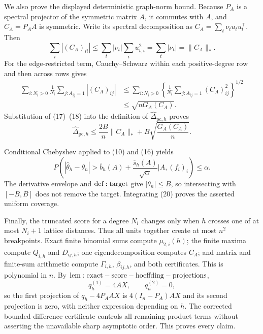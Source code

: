 We also prove the displayed deterministic graph-norm bound.  Because \(P_A\) is a spectral projector of the symmetric matrix \(A\), it commutes with \(A\), and \(C_A=P_AA\) is symmetric.  Write its spectral decomposition as \(C_A=\sum_t\nu_tu_tu_t^\top\).  Then
\[
 \sum_i|(C_A)_{ii}|
 \le\sum_t|\nu_t|\sum_i u_{t,i}^2
 =\sum_t|\nu_t|=\|C_A\|_*.
\tag{17}
\]
For the edge-restricted term, Cauchy--Schwarz within each positive-degree row and then across rows gives
\[
 \begin{aligned}
 \sum_{i:N_i>0}\frac1{N_i}\sum_{j:A_{ij}=1}|(C_A)_{ij}|
 &\le\sum_{i:N_i>0}
 \left\{\frac1{N_i}\sum_{j:A_{ij}=1}(C_A)_{ij}^2\right\}^{1/2}\\
 &\le\sqrt{nG_A(C_A)}.
 \end{aligned}
\tag{18}
\]
Substitution of (17)--(18) into the definition of \(\widehat\Delta_{\mathrm{pc},h}\) proves
\[
 \widehat\Delta_{\mathrm{pc},h}
 \le\frac{2B}{n}\|C_A\|_*+B\sqrt{\frac{G_A(C_A)}n}.
\tag{19}
\]

Conditional Chebyshev applied to (10) and (16) yields
\[
 P\!\left(
 |\widehat\theta_h-\theta_n|>
 \overline b_h(A)+\frac{\overline s_h(A)}{\sqrt\alpha}
 \mathrel{\Big|}A,(f_i)_i\right)\le\alpha.
\tag{20}
\]
The derivative envelope and \({\rm def:target}\) give \(|\theta_n|\le B\), so intersecting with \([-B,B]\) does not remove the target.  Integrating (20) proves the asserted uniform coverage.

Finally, the truncated score for a degree \(N_i\) changes only when \(h\) crosses one of at most \(N_i+1\) lattice distances.  Thus all units together create at most \(n^2\) breakpoints.  Exact finite binomial sums compute \(\mu_{2,i}(h)\); the finite maxima compute \(Q_{i,h}\) and \(D_{ij,h}\); one eigendecomposition computes \(C_A\); and matrix and finite-sum arithmetic compute \(\Gamma_{i,h}\), \(\beta_{ij,h}\), and both certificates.  This is polynomial in \(n\).  By \({\rm lem:exact-score-hoeffding-projections}\),
\[
 q_h^{(1)}=4AX,\qquad q_h^{(2)}=0,
\]
so the first projection of \(q_h-4P_AAX\) is \(4(I_n-P_A)AX\) and its second projection is zero, with neither expression depending on \(h\).  The corrected bounded-difference certificate controls all remaining product terms without asserting the unavailable sharp asymptotic order.  This proves every claim.
